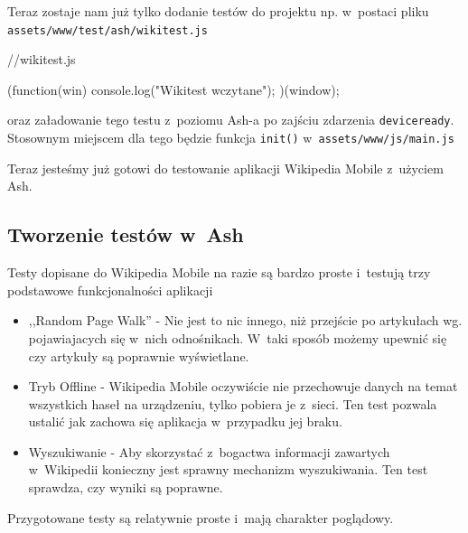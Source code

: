 \documentclass[brudnopis]{xmgr}
\begin{document}
Teraz zostaje nam już tylko dodanie testów do projektu np. w~postaci pliku  \texttt{assets/www/test/ash/wikitest.js} 

\begin{javascriptcode}
   //wikitest.js

  (function(win){  
    console.log("Wikitest wczytane");
  })(window);
\end{javascriptcode}

\noindent oraz załadowanie tego testu z~poziomu Ash-a po zajściu zdarzenia \texttt{deviceready}. Stosownym miejscem dla tego będzie funkcja \texttt{init()} w~\texttt{assets/www/js/main.js}


\noindent Teraz jesteśmy już gotowi do testowanie aplikacji Wikipedia Mobile z~użyciem Ash.

\subsection{Tworzenie testów w~Ash}

Testy dopisane do Wikipedia Mobile na razie są bardzo proste i~testują trzy podstawowe funkcjonalności aplikacji 

\begin{itemize}
  \item ,,Random Page Walk'' - Nie jest to nic innego, niż przejście po artykułach wg. pojawiajacych się w~nich odnośnikach. W~taki sposób możemy upewnić się czy artykuły są poprawnie wyświetlane.
  \item Tryb Offline - Wikipedia Mobile oczywiście nie przechowuje danych na temat wszystkich haseł na urządzeniu, tylko pobiera je z~sieci. Ten test pozwala ustalić jak zachowa się aplikacja w~przypadku jej braku.
  \item Wyszukiwanie - Aby skorzystać z~bogactwa informacji zawartych w~Wikipedii konieczny jest sprawny mechanizm wyszukiwania. Ten test sprawdza, czy wyniki są poprawne.  
\end{itemize}

Przygotowane testy są relatywnie proste i~mają charakter poglądowy. 
\end{document}

